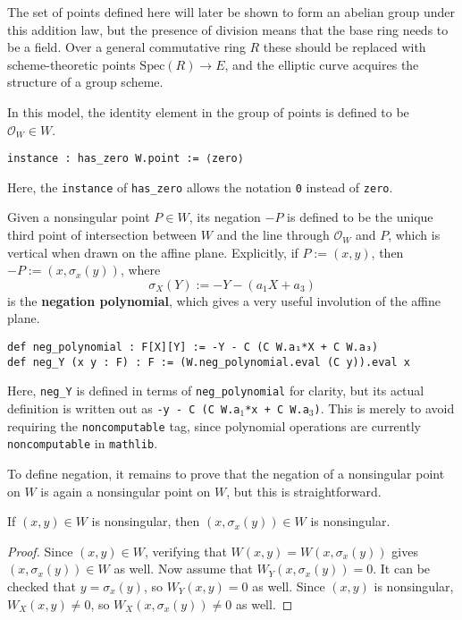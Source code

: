 \documentclass[a4paper,UKenglish,cleveref,autoref,thm-restate]{lipics-v2021}
\begin{document}
\begin{remark}
The set of points defined here will later be shown to form an abelian group under this addition law, but the presence of division means that the base ring needs to be a field. Over a general commutative ring $ R $ these should be replaced with scheme-theoretic points $ \mathrm{Spec}(R) \to E $, and the elliptic curve acquires the structure of a group scheme.
\end{remark}

In this model, the identity element in the group of points is defined to be $ \mathcal{O}_W \in W $.
\begin{lstlisting}
instance : has_zero W.point := ⟨zero⟩
\end{lstlisting}
Here, the \texttt{instance} of \texttt{has\_zero} allows the notation \texttt{0} instead of \texttt{zero}.

Given a nonsingular point $ P \in W $, its negation $ -P $ is defined to be the unique third point of intersection between $ W $ and the line through $ \mathcal{O}_W $ and $ P $, which is vertical when drawn on the affine plane. Explicitly, if $ P := (x, y) $, then $ -P := (x, \sigma_x(y)) $, where
\[ \sigma_X(Y) := -Y - (a_1X + a_3) \]
is the \textbf{negation polynomial}, which gives a very useful involution of the affine plane.
\begin{lstlisting}
def neg_polynomial : F[X][Y] := -Y - C (C W.a₁*X + C W.a₃)
def neg_Y (x y : F) : F := (W.neg_polynomial.eval (C y)).eval x
\end{lstlisting}
Here, \texttt{neg\_Y} is defined in terms of \texttt{neg\_polynomial} for clarity, but its actual definition is written out as \texttt{-y - C (C W.a\ensuremath{_1}*x + C W.a\ensuremath{_3})}. This is merely to avoid requiring the \texttt{noncomputable} tag, since polynomial operations are currently \texttt{noncomputable} in \texttt{mathlib}.

To define negation, it remains to prove that the negation of a nonsingular point on $ W $ is again a nonsingular point on $ W $, but this is straightforward.

\begin{lemma}
\label{lem:nonsingular_neg}
If $ (x, y) \in W $ is nonsingular, then $ (x, \sigma_x(y)) \in W $ is nonsingular.
\end{lemma}

\begin{proof}
Since $ (x, y) \in W $, verifying that $ W(x, y) = W(x, \sigma_x(y)) $ gives $ (x, \sigma_x(y)) \in W $ as well. Now assume that $ W_Y(x, \sigma_x(y)) = 0 $. It can be checked that $ y = \sigma_x(y) $, so $ W_Y(x, y) = 0 $ as well. Since $ (x, y) $ is nonsingular, $ W_X(x, y) \ne 0 $, so $ W_X(x, \sigma_x(y)) \ne 0 $ as well.
\end{proof}
\end{document}
